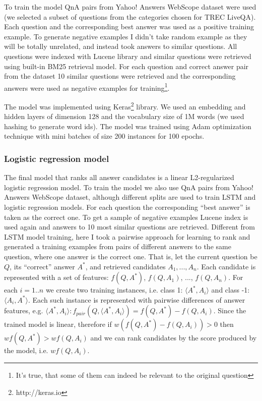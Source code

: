 \documentclass[]{article}
\begin{document}
To train the model QnA pairs from Yahoo! Answers WebScope dataset were used (we selected a subset of questions from the categories chosen for TREC LiveQA).
Each question and the corresponding best answer was used as a positive training example.
To generate negative examples I didn't take random example as they will be totally unrelated, and instead took answers to similar questions.
All questions were indexed with Lucene library and similar questions were retrieved using built-in BM25 retrieval model.
For each question and correct answer pair from the dataset 10 similar questions were retrieved and the corresponding answers were used as negative examples for training\footnote{It's true, that some of them can indeed be relevant to the original question}.

The model was implemented using Keras\footnote{http://keras.io} library.
We used an embedding and hidden layers of dimension 128 and the vocabulary size of 1M words (we used hashing to generate word ids).
The model was trained using Adam optimization technique \cite{kingma2014adam} with mini batches of size 200 instances for 100 epochs.

\subsubsection{Logistic regression model}

The final model that ranks all answer candidates is a linear L2-regularized logistic regression model.
To train the model we also use QnA pairs from Yahoo! Answers WebScope dataset, although different splits are used to train LSTM and logistic regression models.
For each question the corresponding ``best answer'' is taken as the correct one.
To get a sample of negative examples Lucene index is used again and answers to 10 most similar questions are retrieved.
Different from LSTM model training, here I took a pairwise approach for learning to rank and generated a training examples from pairs of different answers to the same question, where one answer is the correct one.
That is, let the current question be $Q$, its ``correct'' answer $A^*$, and retrieved candidates $A_1, ..., A_n$.
Each candidate is represented with a set of features: $f(Q, A^*)$, $f(Q, A_1)$, ..., $f(Q, A_n)$.
For each $i=1..n$ we create two training instances, i.e. class 1: $\langle A^*, A_i\rangle$ and class -1: $\langle A_i, A^*\rangle$.
Each such instance is represented with pairwise differences of answer features, e.g. $\langle A^*, A_i\rangle: f_{pair}(Q, \langle A^*, A_i\rangle) = f(Q, A^*) - f(Q, A_i)$.
Since the trained model is linear, therefore if $w(f(Q, A^*) - f(Q, A_i)) > 0$ then $w f(Q, A^*) > w f(Q, A_i)$ and we can rank candidates by the score produced by the model, i.e. $w f(Q, A_i)$.
\end{document}

